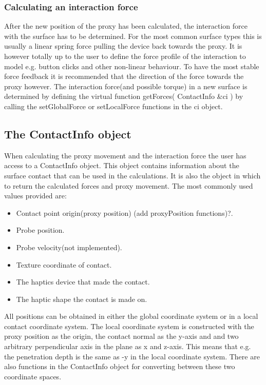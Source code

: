 \subsubsection{Calculating an interaction force}
After the new position of the proxy has been calculated, the interaction force with the surface has to be determined. For the most common surface types this is usually a linear spring force pulling the device back towards the proxy. It is however totally up to the user to define the force profile of the interaction to model e.g. button clicks and other non-linear behaviour. To have the most stable force feedback it is recommended that the direction of the force towards the proxy however.  
The interaction force(and possible torque) in a new surface is determined by defining the virtual function getForces( ContactInfo \&ci ) by calling the setGlobalForce or setLocalForce functions in the ci object. 

\subsection{The ContactInfo object}
When calculating the proxy movement and the interaction force the user has access to a ContactInfo object. This object contains information about the surface contact that can be used in the calculations. It is also the object in which to return the calculated forces and proxy movement. The most commonly used values provided are:

\begin{itemize}
\item Contact point origin(proxy position) (add proxyPosition functions)?.
\item Probe position.
\item Probe velocity(not implemented).
\item Texture coordinate of contact.
\item The haptics device that made the contact.
\item The haptic shape the contact is made on.
\end{itemize}


All positions can be obtained in either the global coordinate system or
in a local contact coordinate system. The local coordinate system is constructed with the proxy position as the origin, the contact normal as the y-axis and and two arbitrary perpendicular axis in the plane as x and z-axis. This means that e.g. the penetration depth is the same as -y in the local coordinate system. There are also functions in the ContactInfo object for converting between these two coordinate spaces. 

